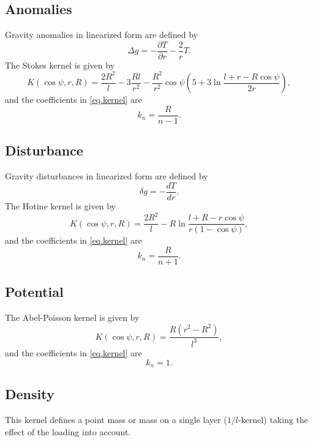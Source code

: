 \subsection{Anomalies}
Gravity anomalies in linearized form are defined by
\begin{equation}
\Delta g = -\frac{\partial T}{\partial r}-\frac{2}{r}T.
\end{equation}
The Stokes kernel is given by
\begin{equation}
K(\cos\psi,r,R) = \frac{2R^2}{l}-3\frac{Rl}{r^2}-\frac{R^2}{r^2}\cos\psi
\left(5+3\ln\frac{l+r-R\cos\psi}{2r}\right),
\end{equation}
and the coefficients in \eqref{eq.kernel} are
\begin{equation}
k_n = \frac{R}{n-1}.
\end{equation}


\subsection{Disturbance}\label{kernelType:disturbance}
Gravity disturbances in linearized form are defined by
\begin{equation}
\delta g = -\frac{dT}{dr}.
\end{equation}
The Hotine kernel is given by
\begin{equation}
K(\cos\psi,r,R) = \frac{2R^2}{l}-R\ln\frac{l+R-r\cos\psi}{r(1-\cos\psi)},
\end{equation}
and the coefficients in \eqref{eq.kernel} are
\begin{equation}
k_n = \frac{R}{n+1}.
\end{equation}


\subsection{Potential}
The Abel-Poisson kernel is given by
\begin{equation}
K(\cos\psi,r,R) = \frac{R(r^2-R^2)}{l^3},
\end{equation}
and the coefficients in \eqref{eq.kernel} are
\begin{equation}
k_n = 1.
\end{equation}


\subsection{Density}
This kernel defines a point mass or mass on a single layer ($1/l$-kernel)
taking the effect of the loading into account.

